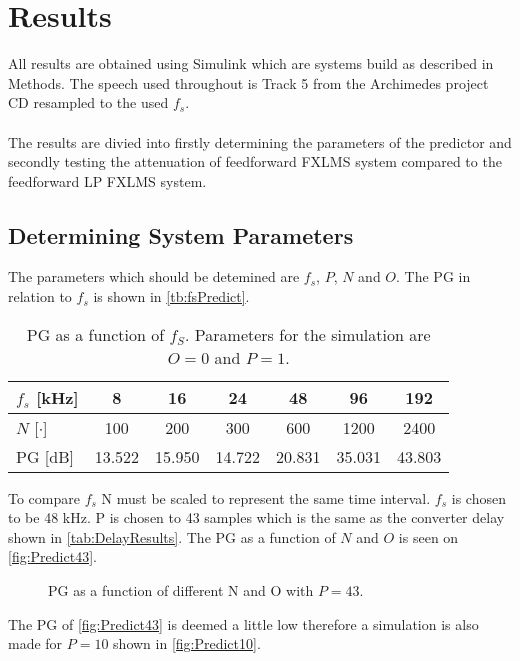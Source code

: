 \section{Results}
All results are obtained using Simulink\textsuperscript{\textregistered} which are systems build as described in Methods. The speech used throughout is Track 5 from the Archimedes project CD resampled to the used $f_s$.  
\\\\
The results are divied into firstly determining the parameters of the predictor and secondly testing the attenuation of feedforward FXLMS system compared to the feedforward LP FXLMS system.   

\subsection{Determining System Parameters}
The parameters which should be detemined are $f_s$, $P$, $N$ and $O$.         
The PG in relation to $f_s$ is shown in \autoref{tb:fsPredict}.

\begin{table}[H]
\centering
\begin{tabular}{|l|c|c|c|c|c|c|}
\hline
$f_s$ {[}kHz{]} & 8 & 16 & 24 & 48 & 96 & 192 \\ \hline 
$N$ {[}$\cdot${]} & 100 & 200 & 300 & 600 & 1200 & 2400 \\ \hline 
PG {[}dB{]} & 13.522 & 15.950 & 14.722 & 20.831 & 35.031 & 43.803 \\ \hline
\end{tabular}
\caption{PG as a function of $f_S$. Parameters for the simulation are $O=0$ and $P=1$.}
\label{tb:fsPredict}
\end{table}

To compare $f_s$ N must be scaled to represent the same time interval. $f_s$ is chosen to be 48 kHz. P is chosen to 43 samples which is the same as the converter delay shown in \autoref{tab:DelayResults}.  
The PG as a function of $N$ and $O$ is seen on \autoref{fig:Predict43}. 

\begin{figure}[H]
	\centering
	
	\caption{PG as a function of different N and O with $P=43$.}
	\label{fig:Predict43}
\end{figure}

The PG of \autoref{fig:Predict43} is deemed a little low therefore a simulation is also made for $P=10$ shown in \autoref{fig:Predict10}.

